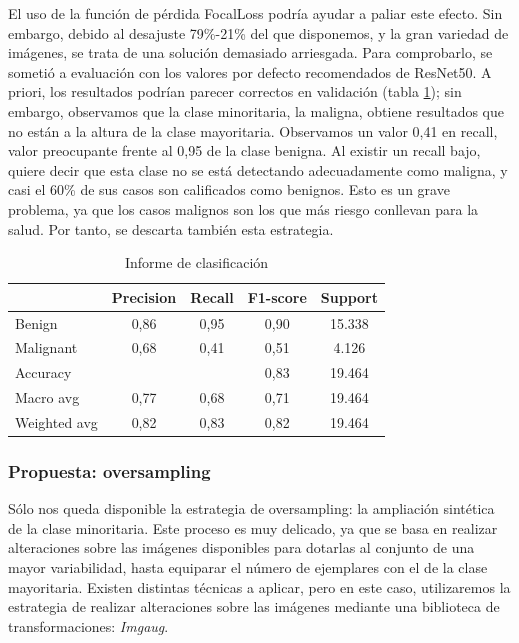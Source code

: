 El uso de la función de pérdida FocalLoss podría ayudar a paliar este efecto. Sin embargo, debido al desajuste 79\%-21\% del que disponemos, y la gran variedad de imágenes, se trata de una solución demasiado arriesgada. Para comprobarlo, se sometió a evaluación con los valores por defecto recomendados de ResNet50. A priori, los resultados podrían parecer correctos en validación (tabla \ref{tab:resultsfl}); sin embargo, observamos que la clase minoritaria, la maligna, obtiene resultados que no están a la altura de la clase mayoritaria. Observamos un valor 0,41 en recall, valor preocupante frente al 0,95 de la clase benigna. Al existir un recall bajo, quiere decir que esta clase no se está detectando adecuadamente como maligna, y casi el 60\% de sus casos son calificados como benignos. Esto es un grave problema, ya que los casos malignos son los que más riesgo conllevan para la salud. Por tanto, se descarta también esta estrategia.


\begin{table}[!ht]
	\centering
	\begin{tabular}{|l|c|c|c|c|}
		\hline
		& Precision & Recall & F1-score & Support \\
		\hline
		Benign & 0,86 & 0,95 & 0,90 & 15.338 \\
		Malignant & 0,68 & 0,41 & 0,51 & 4.126 \\
		\hline
		Accuracy &  &  & 0,83 & 19.464 \\
		Macro avg & 0,77& 0,68& 0,71&19.464\\
		Weighted avg&0,82&0,83&0,82&19.464\\
		\hline
	\end{tabular}
	\caption{Informe de clasificación}
	\label{tab:resultsfl}
\end{table}

\subsubsection{Propuesta: oversampling}

Sólo nos queda disponible la estrategia de oversampling: la ampliación sintética de la clase minoritaria. Este proceso es muy delicado, ya que se basa en realizar alteraciones sobre las imágenes disponibles para dotarlas al conjunto de una mayor variabilidad, hasta equiparar el número de ejemplares con el de la clase mayoritaria. Existen distintas técnicas a aplicar, pero en este caso, utilizaremos la estrategia de realizar alteraciones sobre las imágenes mediante una biblioteca de transformaciones: \textit{Imgaug}.

